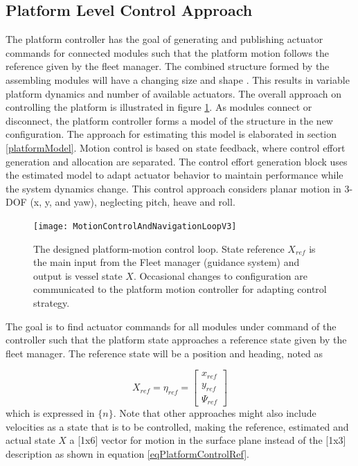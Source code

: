 \subsection{Platform Level Control Approach}
\label{subsection:PlatformControlApproach}
The platform controller has the goal of generating and publishing actuator commands for connected modules such that the platform motion follows the reference given by the fleet manager. 
The combined structure formed by the assembling modules will have a changing size and shape . This results in variable platform dynamics and number of available actuators. The overall approach on controlling the platform is illustrated in figure \ref{fig:motionControlApproach}. 
As modules connect or disconnect, the platform controller forms a model of the structure in the new configuration. The approach for estimating this model is elaborated in section \ref{platformModel}. Motion control is based on state feedback, where control effort generation and allocation are separated. The control effort generation block uses the estimated model to adapt actuator behavior to maintain performance while the system dynamics change. 
This control approach considers planar motion in 3-DOF (x, y, and yaw), neglecting pitch, heave and roll. 

\begin{figure}[H]
	\centering
	\captionsetup{justification=centering}
	\texttt{[image: MotionControlAndNavigationLoopV3]}
	\caption{The designed platform-motion control loop. State reference $X_{ref}$ is the main input from the Fleet manager (guidance system) and output is vessel state $X$. Occasional changes to configuration are communicated to the platform motion controller for adapting control strategy.}
	\label{fig:motionControlApproach}
\end{figure}

The goal is to find actuator commands for all modules under command of the controller such that the platform state approaches a reference state given by the fleet manager. The reference state will be a position and heading, noted as

\begin{equation}
X_{ref} = \eta_{ref} = \begin{bmatrix} x_{ref}\\ y_{ref} \\ \Psi_{ref} \end{bmatrix}
\label{eqPlatformControlRef}
\end{equation}
which is expressed in $\{n\}$. Note that other approaches might also include velocities as a state that is to be controlled, making the reference, estimated and actual state $X$ a [1x6] vector for motion in the surface plane instead of the [1x3] description as shown in equation \ref{eqPlatformControlRef}.

